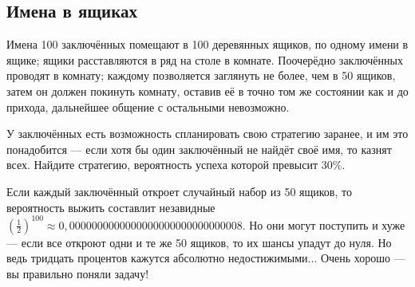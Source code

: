 \subsection*{Имена в ящиках}

Имена 100 заключённых помещают в 100 деревянных ящиков, по одному имени в ящике;
ящики расставляются в ряд на столе в комнате.
Поочерёдно заключённых проводят в комнату;
каждому позволяется заглянуть не более, чем в 50 ящиков,
затем он должен покинуть комнату, оставив её в точно том же состоянии как и до прихода,
дальнейшее общение с остальными невозможно.

У заключённых есть возможность спланировать свою стратегию заранее, и им это понадобится --- если хотя бы один заключённый не найдёт своё имя, то казнят всех.
Найдите стратегию, вероятность успеха которой превысит 30\%.

 Если каждый заключённый откроет случайный набор из 50 ящиков, то вероятность выжить составлит незавидные $(\tfrac12)^{100}\approx 0{,}0000000000000000000000000000008$.
Но они могут поступить и хуже --- если все откроют одни и те же 50 ящиков, то их шансы упадут до нуля.
Но ведь тридцать процентов кажутся абсолютно недостижимыми...
Очень хорошо --- вы правильно поняли задачу!
